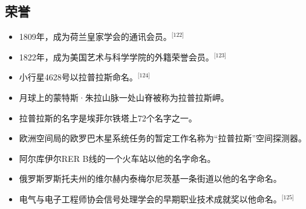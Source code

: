 \subsection{荣誉}  
\begin{itemize}
\item 1809年，成为荷兰皇家学会的通讯会员。\(^\text{[122]}\)
\item 1822年，成为美国艺术与科学学院的外籍荣誉会员。\(^\text{[123]}\)
\item 小行星4628号以拉普拉斯命名。\(^\text{[124]}\)
\item 月球上的蒙特斯·朱拉山脉一处山脊被称为拉普拉斯岬。  
\item 拉普拉斯的名字是埃菲尔铁塔上72个名字之一。  
\item 欧洲空间局的欧罗巴木星系统任务的暂定工作名称为“拉普拉斯”空间探测器。  
\item 阿尔库伊尔RER B线的一个火车站以他的名字命名。  
\item 俄罗斯罗斯托夫州的维尔赫内泰梅尔尼茨基一条街道以他的名字命名。  
\item 电气与电子工程师协会信号处理学会的早期职业技术成就奖以他命名。\(^\text{[125]}\)
\end{itemize}
